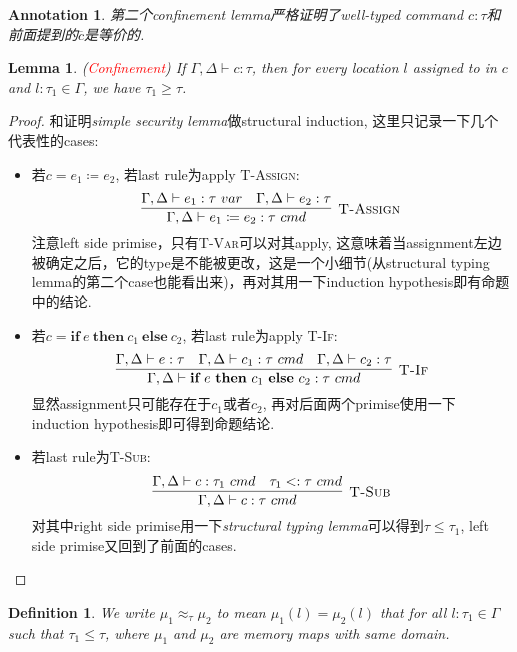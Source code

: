 \documentclass{article}
\newtheorem{lemma}[theorem]{Lemma}
\newtheorem{definition}[theorem]{Definition}
\newtheorem{annotation}[theorem]{Annotation}
\newcommand{\redt}[1]{\textcolor{red}{#1}}
\newcommand{\termtype}[2]{\ensuremath{#1:#2}}
\newcommand{\ifelse}[3]{\ensuremath{\textbf{if}~#1~\textbf{then}~#2~\textbf{else}~#3}}
\begin{document}
\begin{annotation}
\rm 第二个\emph{confinement lemma}严格证明了well-typed command $\termtype{c}{\tau}$和前面提到的$\overline{c}$是等价的. 
\end{annotation}

\begin{lemma}
\rm (\redt{Confinement}) If $\Gamma,\Delta \vdash \termtype{c}{\tau}$, then for every location $l$ assigned to in $c$ and $\termtype{l}{\tau_1} \in \Gamma$, we have $\tau_1 \geq \tau$.
\end{lemma}

\begin{proof}
\rm 和证明\emph{simple security lemma}做structural induction, 这里只记录一下几个代表性的cases:
\begin{itemize}
	\item 若$c = e_1 \coloneqq e_2$, 若last rule为apply \textsc{T-Assign}:
	\[
		\infer[\textsc{T-Assign}]{\Gamma, \Delta \vdash \termtype{e_1 \coloneqq e_2}{\tau~cmd}}{\Gamma, \Delta \vdash \termtype{e_1}{\tau~var} & \Gamma, \Delta \vdash \termtype{e_2}{\tau}}
	\]
	注意left side primise，只有\textsc{T-Var}可以对其apply, 这意味着当assignment左边被确定之后，它的type是不能被更改，这是一个小细节(从structural typing lemma的第二个case也能看出来)，再对其用一下induction hypothesis即有命题中的结论. 	
	\item 若$c = \ifelse{e}{c_1}{c_2}$, 若last rule为apply \textsc{T-If}:
\[
	\infer[\textsc{T-If}]{\Gamma, \Delta \vdash \termtype{\ifelse{e}{c_1}{c_2}}{\tau~cmd}}{\Gamma, \Delta \vdash \termtype{e}{\tau} & \Gamma, \Delta \vdash \termtype{c_1}{\tau~cmd} & \Gamma, \Delta \vdash \termtype{c_2}{\tau}}
\]
	显然assignment只可能存在于$c_1$或者$c_2$, 再对后面两个primise使用一下induction hypothesis即可得到命题结论.
	\item 若last rule为\textsc{T-Sub}:
	\[
		\infer[\textsc{T-Sub}]{\Gamma, \Delta \vdash \termtype{c}{\tau~cmd}}{\Gamma, \Delta \vdash \termtype{c}{\tau_1~cmd} & \tau_1 <: \tau~cmd}
	\]
	对其中right side primise用一下\emph{structural typing lemma}可以得到$\tau \leq \tau_1$, left side primise又回到了前面的cases. 
\end{itemize}
\end{proof}

\begin{definition}
\rm We write $\mu_1 \approx_\tau \mu_2$ to mean $\mu_1(l) = \mu_2(l)$ that for all $\termtype{l}{\tau_1} \in \Gamma$ such that $\tau_1 \leq \tau$, where $\mu_1$ and $\mu_2$ are memory maps with same domain. 
\end{definition}
\end{document}
